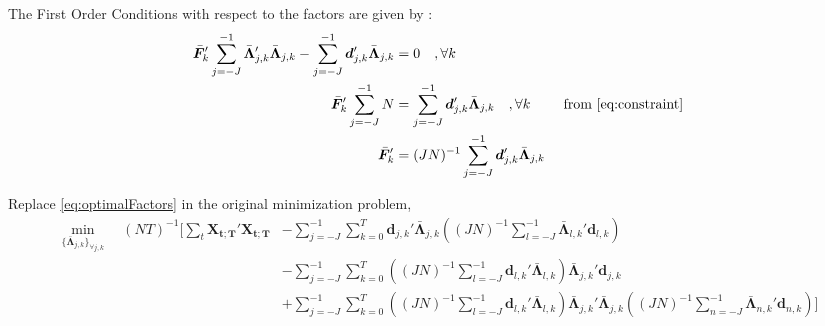 \documentclass{article}
\numberwithin{equation}{section}
\let \oldsum \sum
\renewcommand{\sum}{\displaystyle \oldsum}
\newcommand{\X}[1]{\bm{X_{#1;T}}}
\newcommand{\wavelet}[3]{\psi_{#1,#2}(#3)}
\newcommand{\scalesum}{\sum_{j=-J}^{-1}}
\newcommand{\scalesumi}{\sum_{l=-J}^{-1}}
\newcommand{\locsum}{\sum_{k=0}^{T}}
\newcommand{\coeffs}[2]{\bm{d}_{#1,#2}}
\newcommand{\optLoadings}[2]{\bar{\bm{\Lambda}}_{#1,#2}}
\newcommand{\setOptLoadings}{\{ \bar{\bm{\Lambda}}_{j,k} \}_{\forall j,k}}
\newcommand{\factors}[1]{\bm{F}_{#1}}
\newcommand{\optFactors}[1]{\bar{\bm{F}}_{#1}}
\begin{document}
The First Order Conditions with respect to the factors are given by : 
	\begin{align}
		\optFactors{k}' \scalesum \optLoadings{j}{k}'\optLoadings{j}{k} - \scalesum \coeffs{j}{k}' \optLoadings{j}{k} &= 0 \quad, \forall k \nonumber\\
		\optFactors{k}' \scalesum N &= \scalesum \coeffs{j}{k}' \optLoadings{j}{k} \quad, \forall k &\text{ from } \eqref{eq:constraint} \nonumber \\
		\optFactors{k}'  &= (JN)^{-1}\scalesum \coeffs{j}{k}' \optLoadings{j}{k} \label{eq:optimalFactors}
	\end{align}

 

	Replace \eqref{eq:optimalFactors} in the original minimization problem, 
	\begin{align*}
		\min_{\setOptLoadings} \quad (NT)^{-1} \Big[ \sum_t \X{t}'\X{t} &- \scalesum \locsum\coeffs{j}{k}' \optLoadings{j}{k}\left((JN)^{-1}\scalesumi  \optLoadings{l}{k}' \coeffs{l}{k}\right) \\
		&- \scalesum \locsum \left((JN)^{-1}\scalesumi  \coeffs{l}{k}' \optLoadings{l}{k} \right)\optLoadings{j}{k}' \coeffs{j}{k} \\
	       &+ \scalesum \locsum \left((JN)^{-1}\scalesumi  \coeffs{l}{k}' \optLoadings{l}{k} \right)\optLoadings{j}{k}'\optLoadings{j}{k}\left((JN)^{-1}\sum_{n=-J}^{-1}  \optLoadings{n}{k}' \coeffs{n}{k}\right) \Big]
	\end{align*}
\end{document}
